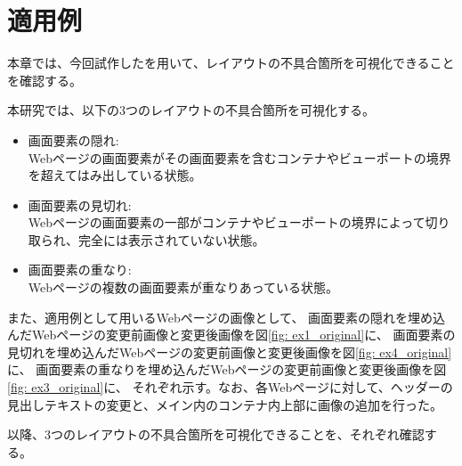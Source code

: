 \chapter{適用例}\label{cha:Indication}
本章では、今回試作した\toolName を用いて、レイアウトの不具合箇所を可視化できることを確認する。
\par
本研究では、以下の3つのレイアウトの不具合箇所を可視化する。
\begin{itemize}
    \setlength{\itemsep}{0pt}
          \setlength{\parsep}{0pt}
    \item 画面要素の隠れ:\\
          Webページの画面要素がその画面要素を含むコンテナやビューポートの境界を超えてはみ出している状態。
    \item 画面要素の見切れ:\\
          Webページの画面要素の一部がコンテナやビューポートの境界によって切り取られ、完全には表示されていない状態。
    \item 画面要素の重なり:\\
          Webページの複数の画面要素が重なりあっている状態。
\end{itemize}
また、適用例として用いるWebページの画像として、
画面要素の隠れを埋め込んだWebページの変更前画像と変更後画像を図\ref{fig: ex1_original}に、
画面要素の見切れを埋め込んだWebページの変更前画像と変更後画像を図\ref{fig: ex4_original}に、
画面要素の重なりを埋め込んだWebページの変更前画像と変更後画像を図\ref{fig: ex3_original}に、
それぞれ示す。なお、各Webページに対して、ヘッダーの見出しテキストの変更と、メイン内のコンテナ内上部に画像の追加を行った。
\par
以降、3つのレイアウトの不具合箇所を可視化できることを、それぞれ確認する。

